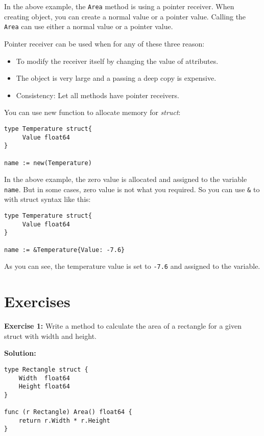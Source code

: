 

In the above example, the \texttt{Area} method is using a pointer
receiver.  When creating object, you can create a normal value or a
pointer value.  Calling the \texttt{Area} can use either a normal
value or a pointer value.

Pointer receiver can be used when for any of
these three reason:

\begin{itemize}
\item To modify the receiver itself by changing the value of attributes.
\item The object is very large and a passing a deep copy is expensive.
\item Consistency: Let all methods have pointer receivers.
\end{itemize}

You can use new function to allocate memory for \textit{struct}:

\begin{lstlisting}[numbers=none]
type Temperature struct{
     Value float64
}

name := new(Temperature)
\end{lstlisting}

In the above example, the zero value is allocated and assigned to the
variable \texttt{name}.  But in some cases, zero value is not what you
required.  So you can use \texttt{\&} to with struct syntax like this:

\begin{lstlisting}[numbers=none]
type Temperature struct{
     Value float64
}

name := &Temperature{Value: -7.6}
\end{lstlisting}

As you can see, the temperature value is set to \texttt{-7.6} and
assigned to the variable.

\section{Exercises}

\textbf{Exercise 1:} Write a method to calculate the area of a rectangle for a
given struct with width and height.

\textbf{Solution:}

\begin{lstlisting}[numbers=none]
type Rectangle struct {
    Width  float64
    Height float64
}

func (r Rectangle) Area() float64 {
    return r.Width * r.Height
}
\end{lstlisting}

